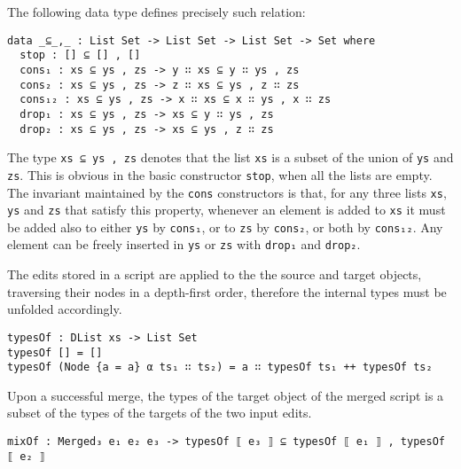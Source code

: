 \documentclass[../Thesis.tex]{subfiles}
\begin{document}
	The following data type defines precisely such relation:

\begin{verbatim}
data _⊆_,_ : List Set -> List Set -> List Set -> Set where
  stop : [] ⊆ [] , []
  cons₁ : xs ⊆ ys , zs -> y ∷ xs ⊆ y ∷ ys , zs
  cons₂ : xs ⊆ ys , zs -> z ∷ xs ⊆ ys , z ∷ zs
  cons₁₂ : xs ⊆ ys , zs -> x ∷ xs ⊆ x ∷ ys , x ∷ zs
  drop₁ : xs ⊆ ys , zs -> xs ⊆ y ∷ ys , zs
  drop₂ : xs ⊆ ys , zs -> xs ⊆ ys , z ∷ zs
\end{verbatim}

	The type \texttt{xs ⊆ ys , zs} denotes that the list \texttt{xs} is a subset
	of the union of \texttt{ys} and \texttt{zs}.
	This is obvious in the basic constructor \texttt{stop}, when all
	the lists are empty.
	The invariant maintained by the \texttt{cons} constructors is that, for any
	three lists \texttt{xs}, \texttt{ys} and \texttt{zs} that satisfy this property,
	 whenever an element is added to \texttt{xs} it must be added also 
	to either \texttt{ys} by \texttt{cons₁}, or  to \texttt{zs} by \texttt{cons₂},
	or both by \texttt{cons₁₂}.
	Any element can be freely inserted in \texttt{ys} or \texttt{zs} with 
	\texttt{drop₁} and \texttt{drop₂}.
	
	The edits stored in a script are applied to the the source and 
	target objects, traversing their nodes in a depth-first order, 
	therefore the internal types must be unfolded accordingly.
	
\begin{verbatim}
typesOf : DList xs -> List Set
typesOf [] = []
typesOf (Node {a = a} α ts₁ ∷ ts₂) = a ∷ typesOf ts₁ ++ typesOf ts₂
\end{verbatim}

	Upon a successful merge, the types of the target object of the merged script
	is a subset of the types of the targets of the two input edits.

\begin{verbatim}	
mixOf : Merged₃ e₁ e₂ e₃ -> typesOf ⟦ e₃ ⟧ ⊆ typesOf ⟦ e₁ ⟧ , typesOf ⟦ e₂ ⟧
\end{verbatim}

\end{document}
